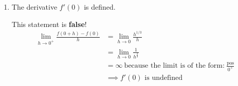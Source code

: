 \documentclass[nooutcomes,handout]{ximera}
\begin{document}
\begin{problem}
\begin{enumerate}
    \item  The derivative $f'(0)$ is defined.
      \begin{freeResponse}
        This statement is \textbf{false}!
        \begin{align*}
          \lim_{h \to 0^+} \frac{f(0  + h) - f(0)}{h}
          &= \lim_{h \to 0} \frac{h^{1/3}}{h} \\
          &= \lim_{h \to 0} \frac{1}{h^{\frac{2}{3}}} \\	
          &= \infty\ \text{because the limit is of the form:}\ \frac{\text{pos}}{0^+}\\
          &\implies \mbox{$f'(0)$ is undefined}
        \end{align*}
      \end{freeResponse}
  \end{enumerate}
\end{problem}	
	
\end{document}
